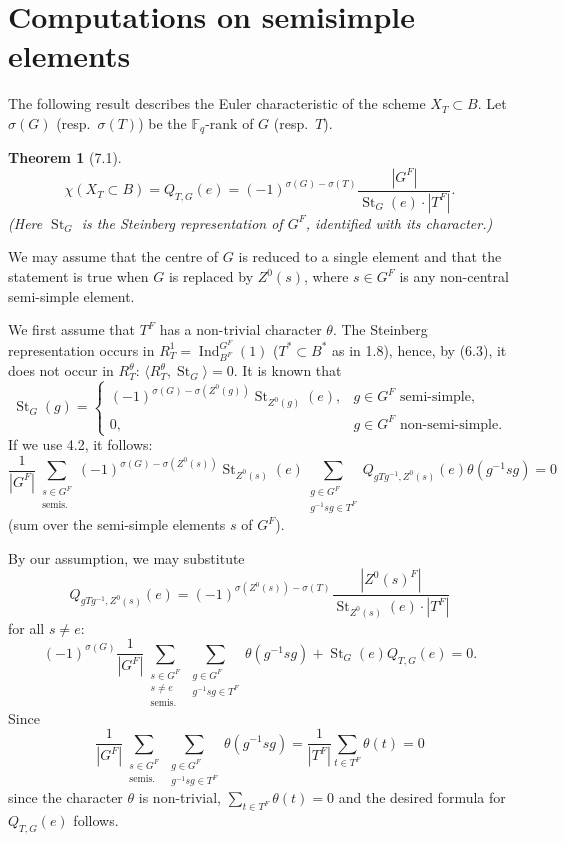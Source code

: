 \documentclass[11pt]{amsart}
\theoremstyle{plain}
\newtheorem{theorem}{Theorem}[section]
\theoremstyle{remark}
\DeclareMathOperator{\Ind}{Ind}
\DeclareMathOperator{\St}{St}
\begin{document}
\section{Computations on semisimple elements}

The following result describes the Euler characteristic of the scheme $X_T \subset B$. Let $\sigma(G)$ (resp.\ $\sigma(T)$) be the $\mathbb{F}_q$-rank of $G$ (resp.\ $T$).

\begin{theorem}[7.1]
\[
\chi(X_T \subset B) = Q_{T,G}(e) = (-1)^{\sigma(G) - \sigma(T)} \frac{|G^F|}{\St_G(e) \cdot |T^F|}.
\]
(Here $\St_G$ is the Steinberg representation of $G^F$, identified with its character.)
\end{theorem}

We may assume that the centre of $G$ is reduced to a single element and that the statement is true when $G$ is replaced by $Z^0(s)$, where $s \in G^F$ is any non-central semi-simple element.

We first assume that $T^F$ has a non-trivial character $\theta$. The Steinberg representation occurs in $R_T^1 = \Ind_{B^F}^{G^F}(1)$ ($T^* \subset B^*$ as in 1.8), hence, by (6.3), it does not occur in $R_T^\theta$: $\langle R_T^\theta, \St_G \rangle = 0$. It is known that
\[
\St_G(g) = \begin{cases}
(-1)^{\sigma(G) - \sigma(Z^0(g))} \St_{Z^0(g)}(e), & g \in G^F \text{ semi-simple}, \\
0, & g \in G^F \text{ non-semi-simple}.
\end{cases}
\]
If we use 4.2, it follows:
\[
\frac{1}{|G^F|} \sum_{\substack{s \in G^F \\ \text{semis.}}} (-1)^{\sigma(G) - \sigma(Z^0(s))} \St_{Z^0(s)}(e) \sum_{\substack{g \in G^F \\ g^{-1}sg \in T^F}} Q_{gTg^{-1}, Z^0(s)}(e) \theta(g^{-1}sg) = 0
\]
(sum over the semi-simple elements $s$ of $G^F$).

By our assumption, we may substitute
\[
Q_{gTg^{-1}, Z^0(s)}(e) = (-1)^{\sigma(Z^0(s)) - \sigma(T)} \frac{|Z^0(s)^F|}{\St_{Z^0(s)}(e) \cdot |T^F|}
\]
for all $s \neq e$:
\[
(-1)^{\sigma(G)} \frac{1}{|G^F|} \sum_{\substack{s \in G^F \\ s \neq e \\ \text{semis.}}} \sum_{\substack{g \in G^F \\ g^{-1}sg \in T^F}} \theta(g^{-1}sg) + \St_G(e) Q_{T,G}(e) = 0.
\]
Since
\[
\frac{1}{|G^F|} \sum_{\substack{s \in G^F \\ \text{semis.}}} \sum_{\substack{g \in G^F \\ g^{-1}sg \in T^F}} \theta(g^{-1}sg) = \frac{1}{|T^F|} \sum_{t \in T^F} \theta(t) = 0
\]
since the character $\theta$ is non-trivial, $\sum_{t \in T^F} \theta(t) = 0$ and the desired formula for $Q_{T,G}(e)$ follows.
\end{document}
